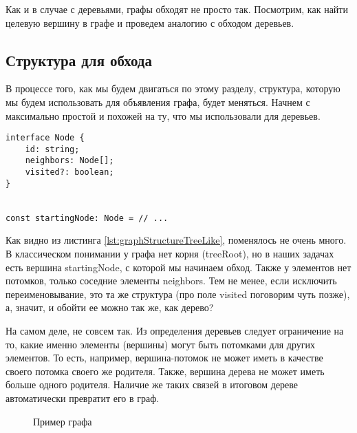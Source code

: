 \documentclass[../../article.tex]{subfiles}
\begin{document}

{Как и в случае с деревьями, графы обходят не просто так. Посмотрим, как найти целевую вершину в графе и проведем аналогию с обходом деревьев.}

\subsection{Структура для обхода}

В процессе того, как мы будем двигаться по этому разделу, структура, которую мы будем использовать для объявления графа, будет меняться. Начнем с максимально простой и похожей на ту, что мы использовали для деревьев.

\begin{ruledelement}
    \begin{lstlisting}[caption={Структура вершины графа}, label={lst:graphStructureTreeLike}]
interface Node {
    id: string;
    neighbors: Node[];
    visited?: boolean;
}


const startingNode: Node = // ...
    \end{lstlisting}
\end{ruledelement}

Как видно из листинга \ref{lst:graphStructureTreeLike}, поменялось не очень много. В классическом понимании у графа нет корня ({\firacodebold treeRoot}), но в наших задачах есть вершина {\firacodebold startingNode}, с которой мы начинаем обход. Также у элементов нет потомков, только соседние элементы {\firacodebold neighbors}. Тем не менее, если исключить переименовывание, это та же структура (про поле {\firacodebold visited} поговорим чуть позже), а, значит, и обойти ее можно так же, как дерево?

На самом деле, не совсем так. Из определения деревьев следует ограничение на то, какие именно элементы (вершины) могут быть потомками для других элементов. То есть, например, вершина-потомок не может иметь в качестве своего потомка своего же родителя. Также, вершина дерева не может иметь больше одного родителя. Наличие же таких связей в итоговом дереве автоматически превратит его в граф.

\begin{figure}
    \caption{Пример графа}
    \label{fig:treeTurningToGraph}
\end{figure}
\end{document}

